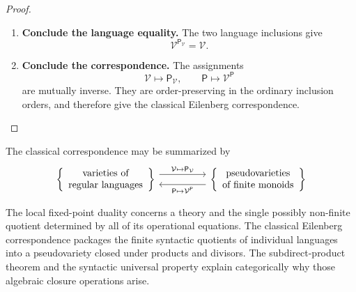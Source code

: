 \begin{proof}
\begin{enumerate}
        The language \(L\) is recognized by its own syntactic monoid.
        Therefore it is recognized by a finite monoid dividing the displayed
        product. Lemma~\ref{lem:to-recognition-products-syntactic} now gives
        \[
            L\in\mathcal V_\Sigma.
        \]
        Hence
        \[
            \mathcal V^{\mathsf P_{\mathcal V}}
            \subseteq
            \mathcal V.
        \]

        \item \textbf{Conclude the language equality.}
        The two language inclusions give
        \[
            \mathcal V^{\mathsf P_{\mathcal V}}
            =
            \mathcal V.
        \]

        \item \textbf{Conclude the correspondence.}
        The assignments
        \[
            \mathcal V\longmapsto\mathsf P_{\mathcal V},
            \qquad
            \mathsf P\longmapsto\mathcal V^{\mathsf P}
        \]
        are mutually inverse. They are order-preserving in the ordinary
        inclusion orders, and therefore give the classical Eilenberg
        correspondence.
    \end{enumerate}
\end{proof}

The classical correspondence may be summarized by
\[
\begin{tikzcd}[column sep=huge]
    \left\{
    \begin{array}{c}
        \text{varieties of}\\
        \text{regular languages}
    \end{array}
    \right\}
        \arrow[r, shift left=1.2ex,
        "{\mathcal V\mapsto\mathsf P_{\mathcal V}}"]
    &
    \left\{
    \begin{array}{c}
        \text{pseudovarieties}\\
        \text{of finite monoids}
    \end{array}
    \right\}
        \arrow[l, shift left=1.2ex,
        "{\mathsf P\mapsto\mathcal V^{\mathsf P}}"]
\end{tikzcd}
\]

\begin{remark}
\label{rem:to-fixed-points-pseudovarieties}
    The local fixed-point duality concerns a theory and the single possibly
    non-finite quotient determined by all of its operational equations.
    The classical Eilenberg correspondence packages the finite syntactic
    quotients of individual languages into a pseudovariety closed under
    products and divisors. The subdirect-product theorem and the syntactic
    universal property explain categorically why those algebraic closure
    operations arise.
\end{remark}


